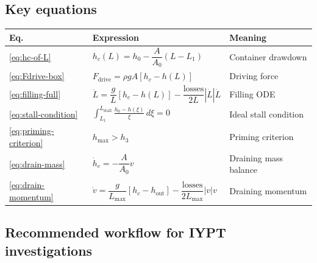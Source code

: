 \documentclass[11pt]{article}
\theoremstyle{definition}
\begin{document}
\subsection{Key equations}

\renewcommand{\arraystretch}{1.4}
\begin{center}
\begin{tabular}{lp{6cm}l}
\toprule
Eq. & Expression & Meaning \\
\midrule
\eqref{eq:hc-of-L} & $h_c(L) = h_0 - \dfrac{A}{A_0}(L - L_1)$ & Container drawdown \\[0.8em]
\eqref{eq:Fdrive-box} & $F_{\text{drive}} = \rho g A[h_c - h(L)]$ & Driving force \\[0.8em]
\eqref{eq:filling-full} & $\ddot{L} = \dfrac{g}{L}[h_c - h(L)] - \dfrac{\text{losses}}{2L}|\dot{L}|\dot{L}$ 
                        & Filling ODE \\[0.8em]
\eqref{eq:stall-condition} & $\displaystyle\int_{L_1}^{L_{\text{stall}}} \frac{h_0 - h(\xi)}{\xi}\,d\xi = 0$ 
                           & Ideal stall condition \\[1em]
\eqref{eq:priming-criterion} & $h_{\max} > h_3$ & Priming criterion \\[0.4em]
\eqref{eq:drain-mass} & $\dot{h}_c = -\dfrac{A}{A_0}v$ & Draining mass balance \\[0.8em]
\eqref{eq:drain-momentum} & $\dot{v} = \dfrac{g}{L_{\max}}[h_c - h_{\text{out}}] - \dfrac{\text{losses}}{2L_{\max}}|v|v$ 
                          & Draining momentum \\
\bottomrule
\end{tabular}
\end{center}

\subsection{Recommended workflow for IYPT investigations}
\end{document}
